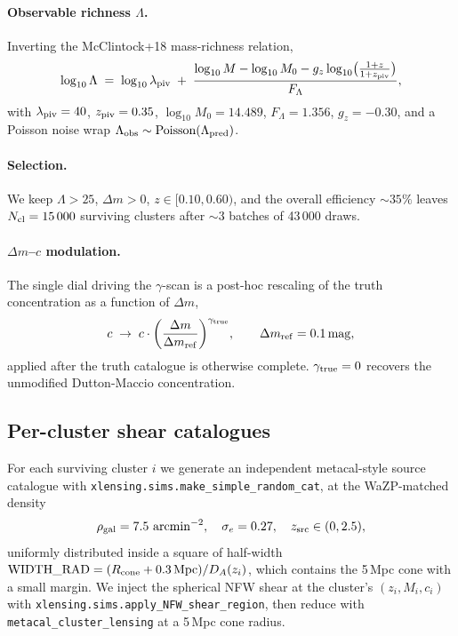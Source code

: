 \documentclass[11pt,a4paper]{article}
\newcommand{\Mpc}{\,\mathrm{Mpc}}
\newcommand{\arcmin}{\,\mathrm{arcmin}}
\newcommand{\gtrue}{\gamma_{\rm true}}
\newcommand{\dmref}{\Delta m_{\rm ref}}
\newcommand{\lpiv}{\lambda_{\rm piv}}
\newcommand{\zpiv}{z_{\rm piv}}
\begin{document}
\paragraph{Observable richness $\Lambda$.}
Inverting the McClintock+18 mass-richness relation,
\begin{equation}
\log_{10}\Lambda
\;=\;
\log_{10}\lpiv \;+\;
\frac{\log_{10} M - \log_{10} M_{0} - g_{z}\log_{10}\bigl(\tfrac{1+z}{1+\zpiv}\bigr)}{F_{\Lambda}},
\end{equation}
with $\lpiv = 40$, $\zpiv = 0.35$, $\log_{10} M_{0} = 14.489$,
$F_{\Lambda} = 1.356$, $g_{z} = -0.30$, and a Poisson noise wrap
$\Lambda_{\rm obs} \sim \mathrm{Poisson}(\Lambda_{\rm pred})$.

\paragraph{Selection.}
We keep
$\Lambda > 25$, $\Delta m > 0$, $z \in [0.10, 0.60)$, and the
overall efficiency $\sim 35\%$ leaves $N_{\rm cl} = 15\,000$ surviving
clusters after $\sim$3 batches of 43\,000 draws.

\paragraph{$\Delta m$--$c$ modulation.}
The single dial driving the $\gamma$-scan is a post-hoc rescaling of
the truth concentration as a function of $\Delta m$,
\begin{equation}
c \;\to\; c \cdot \biggl(\frac{\Delta m}{\dmref}\biggr)^{\gtrue},
\qquad
\dmref = 0.1\,\mathrm{mag},
\label{eq:dmc}
\end{equation}
applied after the truth catalogue is otherwise complete. $\gtrue = 0$
recovers the unmodified Dutton-Maccio concentration.

\subsection{Per-cluster shear catalogues}

For each surviving cluster $i$ we generate an independent metacal-style
source catalogue with
\verb|xlensing.sims.make_simple_random_cat|, at the WaZP-matched density
\begin{equation}
\rho_{\rm gal} = 7.5\,\arcmin^{-2},
\quad
\sigma_e = 0.27,
\quad
z_{\rm src} \in (0, 2.5),
\end{equation}
uniformly distributed inside a square of half-width
$\text{WIDTH\_RAD} = (R_{\rm cone} + 0.3\Mpc) / D_{A}(z_{i})$, which
contains the 5\,Mpc cone with a small margin. We inject the spherical
NFW shear at the cluster's $(z_{i}, M_{i}, c_{i})$ with
\verb|xlensing.sims.apply_NFW_shear_region|, then reduce with
\verb|metacal_cluster_lensing| at a 5\,Mpc cone radius.
\end{document}

